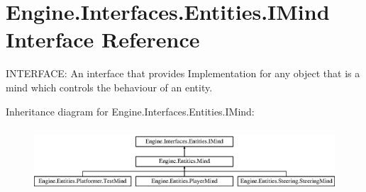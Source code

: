 \hypertarget{a00446}{}\section{Engine.\+Interfaces.\+Entities.\+I\+Mind Interface Reference}
\label{a00446}


I\+N\+T\+E\+R\+F\+A\+CE\+: An interface that provides Implementation for any object that is a mind which controls the behaviour of an entity.  


Inheritance diagram for Engine.\+Interfaces.\+Entities.\+I\+Mind\+:\begin{figure}[H]
\begin{center}
\leavevmode
\includegraphics[height=2.403433cm]{d3/def/a00446}
\end{center}
\end{figure}
